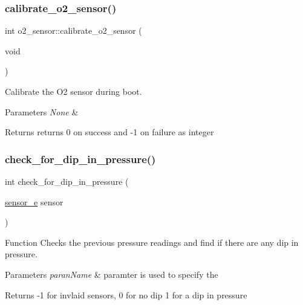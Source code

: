 \subsubsection{\texorpdfstring{calibrate\+\_\+o2\+\_\+sensor()}{calibrate\_o2\_sensor()}}
{\footnotesize\ttfamily int o2\+\_\+sensor\+::calibrate\+\_\+o2\+\_\+sensor (\begin{DoxyParamCaption}\item[{void}]{ }\end{DoxyParamCaption})\hspace{0.3cm}{\ttfamily [protected]}}



Calibrate the O2 sensor during boot. 


\begin{DoxyParams}{Parameters}
{\em None} & \\
\hline
\end{DoxyParams}
\begin{DoxyReturn}{Returns}
returns 0 on success and -\/1 on failure as integer 
\end{DoxyReturn}
\mbox{\label{group___ventilator_module_gad44ae3ff179318970b2a99be7500db74}} 
\subsubsection{\texorpdfstring{check\+\_\+for\+\_\+dip\+\_\+in\+\_\+pressure()}{check\_for\_dip\_in\_pressure()}}
{\footnotesize\ttfamily int check\+\_\+for\+\_\+dip\+\_\+in\+\_\+pressure (\begin{DoxyParamCaption}\item[{\hyperlink{group___base_sensors_module_ga241bbfb8b20d2f411c4c10bb9703288c}{sensor\+\_\+e}}]{sensor }\end{DoxyParamCaption})}



Function Checks the previous pressure readings and find if there are any dip in pressure. 


\begin{DoxyParams}{Parameters}
{\em paran\+Name} & paramter is used to specify the\\
\hline
\end{DoxyParams}
\begin{DoxyReturn}{Returns}
-\/1 for invlaid sensors, 0 for no dip 1 for a dip in pressure 
\end{DoxyReturn}
\mbox{\label{group___ventilator_module_ga882a0452720480e06504493292f2f0e2}} 
